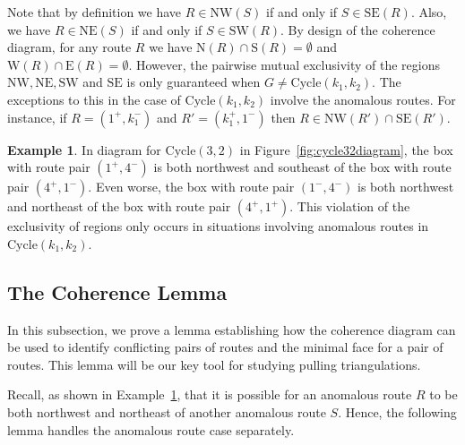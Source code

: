 \documentclass[12pt]{amsart}
\theoremstyle{definition}
\newtheorem{example}[theorem]{Example}
\newcommand\Cycle{\mathrm{Cycle}}
\newcommand\north{\mathrm{N}}
\newcommand\south{\mathrm{S}}
\newcommand\east{\mathrm{E}}
\newcommand\west{\mathrm{W}}
\newcommand\NW{\mathrm{NW}}
\newcommand\NE{\mathrm{NE}}
\newcommand\SW{\mathrm{SW}}
\newcommand\SE{\mathrm{SE}}
\begin{document}
Note that by definition we have $R\in \NW(S)$ if and only if $S\in \SE(R)$.
Also, we have $R\in \NE(S)$ if and only if $S\in \SW(R)$.
By design of the coherence diagram, for any route $R$ we have $\north(R)\cap \south(R) = \emptyset$ and $\west(R) \cap \east(R)=\emptyset$.
However, the pairwise mutual exclusivity of the regions $\NW, \NE, \SW$ and $\SE$ is only guaranteed when $G\neq \Cycle(k_1,k_2)$.
The exceptions to this in the case of $\Cycle(k_1,k_2)$ involve the anomalous routes.
For instance, if $R = (1^+, k_1^-)$ and $R' = (k_1^+, 1^-)$ then $R \in \NW(R')\cap \SE(R')$.

\begin{example}\label{ex:anomalousbadbehavior}
In diagram for $\Cycle(3,2)$ in Figure~\ref{fig:cycle32diagram}, the box with route pair $(1^+,4^-)$ is both northwest and southeast of the box with route pair $(4^+,1^-)$.
Even worse, the box with route pair $(1^-,4^-)$ is both northwest and northeast of the box with route pair $(4^+,1^+)$.
This violation of the exclusivity of regions only occurs in situations involving anomalous routes in $\Cycle(k_1,k_2)$.
\end{example}

\subsection{The Coherence Lemma}\label{sec:coherence}

In this subsection, we prove a lemma establishing how the coherence diagram can be used to identify conflicting pairs of routes and the minimal face for a pair of routes.
This lemma will be our key tool for studying pulling triangulations.

Recall, as shown in Example~\ref{ex:anomalousbadbehavior}, that it is possible for an anomalous route $R$ to be both northwest and northeast of another anomalous route $S$.
Hence, the following lemma handles the anomalous route case separately.
\end{document}
